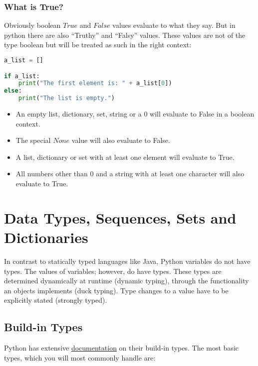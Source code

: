 \documentclass{article}
\begin{document}
\subsubsection{What is True?}

Obviously boolean $True$ and $False$ values evaluate to what they say.
But in python there are also ``Truthy'' and ``Falsy'' values.
These values are not of the type boolean but will be treated as such in the right context:

\begin{lstlisting}[language=Python]
a_list = []

if a_list:
    print("The first element is: " + a_list[0])
else:
    print("The list is empty.")
\end{lstlisting}

\begin{itemize}
    \item An empty list, dictionary, set, string or a 0 will evaluate to False in a boolean context.
    \item The special $None$ value will also evaluate to False.
    \item A list, dictionary or set with at least one element will evaluate to True.
    \item All numbers other than 0 and a string with at least one character will also evaluate to True.
\end{itemize}






\section{Data Types, Sequences, Sets and Dictionaries}

In contrast to statically typed languages like Java, Python variables do not have types.
The values of variables; however, do have types.
These types are determined dynamically at runtime (dynamic typing), through the functionality an objects implements (duck typing).
Type changes to a value have to be explicitly stated (strongly typed).


\subsection{Build-in Types}

Python has extensive \href{https://docs.python.org/3/library/stdtypes.html}{documentation}
on their build-in types.
The most basic types, which you will most commonly handle are:
\end{document}
